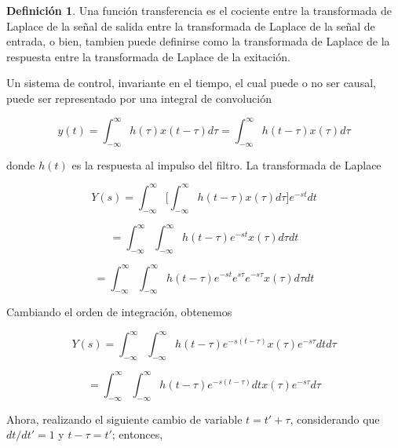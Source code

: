 \documentclass[12pt]{book}
\theoremstyle{definition}
\newtheorem{dfn}{Definición}[section]
\theoremstyle{remark}
\theoremstyle{plain}
\begin{document}
\begin{dfn}
\label{def402}
Una función transferencia es el cociente entre la transformada de Laplace de la señal de salida entre la transformada de Laplace de la señal de entrada, o bien, tambien puede definirse como la transformada de Laplace de la respuesta entre la transformada de Laplace de la exitación.
\end{dfn}

Un sistema de control, invariante en el tiempo, el cual puede o no ser causal, puede ser representado por una integral de convolución

\begin{equation}
\label{equ404}
 y(t)= \int_{- \infty}^{\infty} h(\tau) x(t- \tau)d \tau= \int_{- \infty}^{\infty} h(t - \tau) x( 
\tau) d \tau
\end{equation}

donde $h(t)$ es la respuesta al impulso del filtro. La transformada de Laplace 

\begin{equation*}
 Y(s)=  \int_{- \infty}^{\infty} \bigg [ \int_{- \infty}^{\infty} h(t - \tau) x(\tau)d \tau \bigg ]e^{-s t} d t
\end{equation*}

\begin{equation*}
 = \int_{- \infty}^{\infty}  \int_{- \infty}^{\infty} h(t- \tau) e^{-s t} x(\tau)   d \tau   d t
\end{equation*}

\begin{equation*}
 = \int_{- \infty}^{\infty}  \int_{- \infty}^{\infty} h(t- \tau) e^{-s t}  e^{s \tau} e^{-s \tau} x(\tau)   d \tau   d t
\end{equation*}

Cambiando el orden de integración, obtenemos

\begin{equation*}
Y(s) = \int_{- \infty}^{\infty}  \int_{- \infty}^{\infty} h(t- \tau) e^{-s (t-\tau)}  x(\tau)  e^{-s \tau}  d t d \tau 
\end{equation*}

\begin{equation*}
 = \int_{- \infty}^{\infty}  \int_{- \infty}^{\infty} h(t- \tau) e^{-s (t-\tau)} d t  x(\tau)  e^{-s \tau}  d \tau 
\end{equation*}

Ahora, realizando el siguiente cambio de variable $t=t'+ \tau$, considerando que $d t /d t'=1$ y $t- \tau = t'$; entonces,
\end{document}
